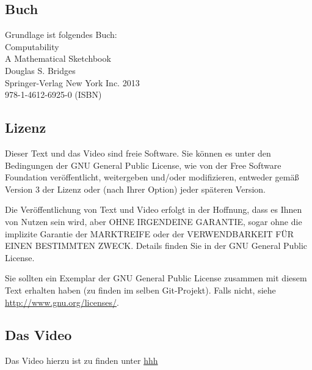 \documentclass[a4paper]{amsart}
\theoremstyle{definition}
\begin{document}
\subsection*{Buch}
Grundlage ist folgendes Buch:\\
Computability\\
A Mathematical Sketchbook\\
Douglas S. Bridges\\
Springer-Verlag New York Inc. 2013\\
978-1-4612-6925-0 (ISBN)

\subsection*{Lizenz}
Dieser Text und das Video sind freie Software. Sie können es unter den Bedingungen der
GNU General Public License, wie von der Free Software Foundation veröffentlicht, weitergeben
und/oder modifizieren, entweder gemäß Version 3 der Lizenz oder (nach Ihrer Option) jeder späteren Version.

Die Veröffentlichung von Text und Video erfolgt in der Hoffnung, dass es Ihnen von Nutzen sein wird,
aber OHNE IRGENDEINE GARANTIE, sogar ohne die implizite Garantie der MARKTREIFE oder der
VERWENDBARKEIT FÜR EINEN BESTIMMTEN ZWECK. Details finden Sie in der GNU General Public License.

Sie sollten ein Exemplar der GNU General Public License zusammen mit diesem Text erhalten haben
(zu finden im selben Git-Projekt).
Falls nicht, siehe \url{http://www.gnu.org/licenses/}.

\subsection*{Das Video}
Das Video hierzu ist zu finden unter
{\tiny
   \url{hhh}
}

\end{document}
